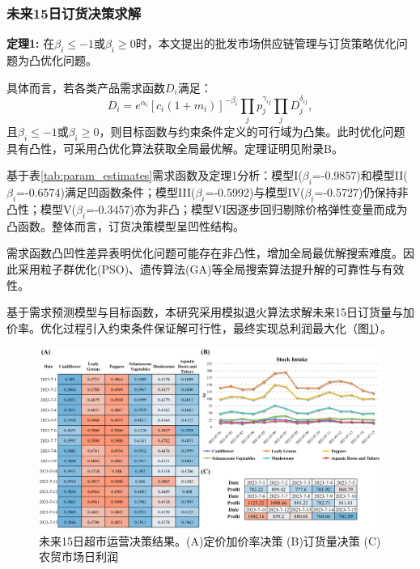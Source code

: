 \documentclass[lang=cn,12pt,a4paper]{elegantpaper}
\begin{document}
\subsubsection{未来15日订货决策求解}
\label{subsubsec:ordering_decision_15_days}

\textbf{定理1:} 在$\beta_i \leq -1$或$\beta_i \geq 0$时，本文提出的批发市场供应链管理与订货策略优化问题为凸优化问题。

具体而言，若各类产品需求函数$D_i$满足：
\begin{equation}
D_i = e^{\alpha_i} \left[ c_i (1 + m_i) \right]^{-\beta_i} \prod_j p_j^{\gamma_{ij}} \prod_j D_j^{\delta_{ij}},
\end{equation}
且$\beta_i \leq -1$或$\beta_i \geq 0$，则目标函数与约束条件定义的可行域为凸集。此时优化问题具有凸性，可采用凸优化算法获取全局最优解。定理证明见附录B。

基于表\ref{tab:param_estimates}需求函数及定理1分析：模型I($\beta_i$=-0.9857)和模型II($\beta_i$=-0.6574)满足凹函数条件；模型III($\beta_i$=-0.5992)与模型IV($\beta_i$=-0.5727)仍保持非凸性；模型V($\beta_i$=-0.3457)亦为非凸；模型VI因逐步回归剔除价格弹性变量而成为凸函数。整体而言，订货决策模型呈凹性结构。

需求函数凸凹性差异表明优化问题可能存在非凸性，增加全局最优解搜索难度。因此采用粒子群优化(PSO)、遗传算法(GA)等全局搜索算法提升解的可靠性与有效性。

基于需求预测模型与目标函数，本研究采用模拟退火算法\citep{Tavares2011}求解未来15日订货量与加价率。优化过程引入约束条件保证解可行性，最终实现总利润最大化（图\ref{fig:fig6}）。

\begin{figure}[H]
    \centering
    \includegraphics[width=1\textwidth]{图片6.png}
    \caption{未来15日超市运营决策结果。(A)定价加价率决策 (B)订货量决策 (C)农贸市场日利润}
    \label{fig:fig6}
\end{figure}
\end{document}
